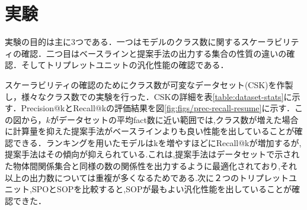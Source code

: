 \section{実験}

実験の目的は主に3つである．一つはモデルのクラス数に関するスケーラビリティの確認．二つ目はベースラインと提案手法の出力する集合の性質の違いの確認．そしてトリプレットユニットの汎化性能の確認である．

スケーラビリティの確認のためにクラス数が可変なデータセット(CSK)を作製し，様々なクラス数での実験を行った．CSKの詳細を表\ref{table:dataset-stats}に示す．Precision@kとRecall@kの評価結果を図\ref{fig:figs/prec-recall-resume}に示す．この図から，$k$がデータセットの平均fact数に近い範囲では,クラス数が増えた場合に計算量を抑えた提案手法がベースラインよりも良い性能を出していることが確認できる．ランキングを用いたモデルはkを増やすほどにRecall@kが増加するが,提案手法はその傾向が抑えられている.これは,提案手法はデータセットで示された物体間関係集合と同様の数の関係性を出力するように最適化されており,それ以上の出力数については重複が多くなるためである.次に２つのトリプレットユニット,SPOとSOPを比較すると,SOPが最もよい汎化性能を出していることが確認できた．

